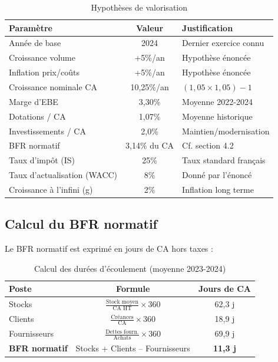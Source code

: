 \documentclass{rapportECL}
\begin{document}
\begin{table}[H]
\centering
\caption{Hypothèses de valorisation}
\begin{tabular}{l c l}
\toprule
\textbf{Paramètre} & \textbf{Valeur} & \textbf{Justification} \\
\midrule
Année de base & 2024 & Dernier exercice connu \\
Croissance volume & +5\%/an & Hypothèse énoncée \\
Inflation prix/coûts & +5\%/an & Hypothèse énoncée \\
Croissance nominale CA & 10,25\%/an & $(1,05 \times 1,05) - 1$ \\
Marge d'EBE & 3,30\% & Moyenne 2022-2024 \\
Dotations / CA & 1,07\% & Moyenne historique \\
Investissements / CA & 2,0\% & Maintien/modernisation \\
BFR normatif & 3,14\% du CA & Cf. section 4.2 \\
Taux d'impôt (IS) & 25\% & Taux standard français \\
Taux d'actualisation (WACC) & 8\% & Donné par l'énoncé \\
Croissance à l'infini (g) & 2\% & Inflation long terme \\
\bottomrule
\end{tabular}
\end{table}

\subsection{Calcul du BFR normatif}

Le BFR normatif est exprimé en jours de CA hors taxes :

\begin{table}[H]
\centering
\caption{Calcul des durées d'écoulement (moyenne 2023-2024)}
\label{tab:durees}
\begin{tabular}{l c c}
\toprule
\textbf{Poste} & \textbf{Formule} & \textbf{Jours de CA} \\
\midrule
Stocks         & $\frac{\text{Stock moyen}}{\text{CA HT}} \times 360$ & 62,3 j \\
Clients        & $\frac{\text{Créances}}{\text{CA}} \times 360$ & 18,9 j \\
Fournisseurs   & $\frac{\text{Dettes fourn.}}{\text{Achats}} \times 360$ & 69,9 j \\
\midrule
\textbf{BFR normatif} & Stocks + Clients -- Fournisseurs & \textbf{11,3 j} \\
\bottomrule
\end{tabular}
\end{table}
\end{document}

